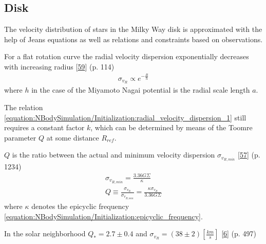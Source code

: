 \documentclass[letterpaper,10pt,english]{sphinxmanual}
\begin{document}
\subsection{Disk}
\label{\detokenize{NBodySimulation/Initialization:disk}}
\sphinxAtStartPar
The velocity distribution of stars in the Milky Way disk is approximated with the help of Jeans equations as well as relations and constraints based on observations.

\sphinxAtStartPar
For a flat rotation curve the radial velocity dispersion exponentially decreases with increasing radius {[}\hyperlink{cite.NBodySimulation/Appendix:id14}{59}{]} (p. 114)
\begin{equation}\label{equation:NBodySimulation/Initialization:radial_velocity_dispersion_1}
\begin{split}\sigma_{v_{R}} \propto e^{-\frac{R}{h}}\end{split}
\end{equation}
\sphinxAtStartPar
where \(h\) in the case of the Miyamoto Nagai potential is the radial scale length \(a\).

\sphinxAtStartPar
The relation \eqref{equation:NBodySimulation/Initialization:radial_velocity_dispersion_1} still requires a constant factor \(k\), which can be determined by means of the Toomre parameter \(Q\) at some distance \(R_{ref}\).

\sphinxAtStartPar
\(Q\) is the ratio between the actual and minimum velocity dispersion \(\sigma_{v_{R,min}}\) {[}\hyperlink{cite.NBodySimulation/Appendix:id16}{57}{]} (p. 1234)
\begin{equation*}
\begin{split}\sigma_{v_{R,min}} = \frac{3.36G\Sigma}{\kappa} \\
Q \equiv \frac{\sigma_{v_{R}}}{\sigma_{v_{R,min}}} = \frac{\kappa \sigma_{v_{R}}}{3.36G\Sigma }\end{split}
\end{equation*}
\sphinxAtStartPar
where \(\kappa\) denotes the epicyclic frequency \eqref{equation:NBodySimulation/Initialization:epicyclic_frequency}.

\sphinxAtStartPar
In the solar neighborhood \(Q_{\ast} = 2.7 \pm 0.4\) and \(\sigma_{v_{R}} = (38 \pm 2) \left [ \frac{km}{s} \right ]\) {[}\hyperlink{cite.NBodySimulation/Appendix:id17}{6}{]} (p. 497)
\end{document}
